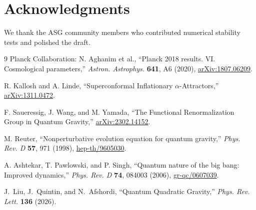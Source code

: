 \documentclass[11pt,a4paper]{article}
\begin{document}
\section*{Acknowledgments}
We thank the ASG community members who contributed numerical stability tests and polished the draft.

\begin{thebibliography}{9}
Planck Collaboration: N. Aghanim et al., ``Planck 2018 results. VI. Cosmological parameters,'' \textit{Astron. Astrophys.} \textbf{641}, A6 (2020), \href{https://arxiv.org/abs/1807.06209}{arXiv:1807.06209}.

R. Kallosh and A. Linde, ``Superconformal Inflationary $\alpha$-Attractors,'' \href{https://arxiv.org/abs/1311.0472}{arXiv:1311.0472}.

F. Saueressig, J. Wang, and M. Yamada, ``The Functional Renormalization Group in Quantum Gravity,'' \href{https://arxiv.org/abs/2302.14152}{arXiv:2302.14152}.

M. Reuter, ``Nonperturbative evolution equation for quantum gravity,'' \textit{Phys. Rev. D} \textbf{57}, 971 (1998), \href{https://arxiv.org/abs/hep-th/9605030}{hep-th/9605030}.

A. Ashtekar, T. Pawlowski, and P. Singh, ``Quantum nature of the big bang: Improved dynamics,'' \textit{Phys. Rev. D} \textbf{74}, 084003 (2006), \href{https://arxiv.org/abs/gr-qc/0607039}{gr-qc/0607039}.

J.~Liu, J.~Quintin, and N.~Afshordi, ``Quantum Quadratic Gravity,'' \textit{Phys. Rev. Lett.} \textbf{136} (2026).
\end{thebibliography}
\end{document}
